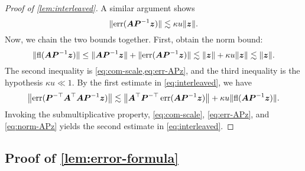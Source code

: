 \documentclass[onefignum,onetabnum,pagebackref,dvipsnames]{siamart220329}
\begin{document}
\begin{proof}[Proof of \cref{lem:interleaved}]
    A similar argument shows
    \begin{equation} \label{eq:err-APz}
        \|{\err(\mat{A}\mat{P}^{-1}\vec{z})}\| \lesssim \kappa u \norm{\vec{z}}.
    \end{equation}
    Now, we chain the two bounds together.
    First, obtain the norm bound:
    \begin{equation}\label{eq:norm-APz}
        \|{\fl(\mat{A}\mat{P}^{-1}\vec{z})}\| \le \|\mat{A}\mat{P}^{-1}\vec{z}\| + \|{\err(\mat{A}\mat{P}^{-1}\vec{z})}\| \lesssim \norm{\vec{z}} + \kappa u \norm{\vec{z}} \lesssim \norm{\vec{z}}.
    \end{equation}
    The second inequality is \cref{eq:com-scale,eq:err-APz}, and the third inequality is the hypothesis $\kappa u \ll 1$.
    By the first estimate in \cref{eq:interleaved}, we have
    \begin{equation*}
        \big\| {\operatorname{err}(\boldsymbol{P}^{-\top}\boldsymbol{A}^\top\boldsymbol{A}\boldsymbol{P}^{-1}\boldsymbol{z})} \big\| \lesssim \big\| \boldsymbol{A}^\top\boldsymbol{P}^{-\top} \operatorname{err}(\boldsymbol{A}\boldsymbol{P}^{-1}\boldsymbol{z})\big\| + \kappa u \|{\operatorname{fl}(\boldsymbol{A}\boldsymbol{P}^{-1}\boldsymbol{z})}\|.
    \end{equation*}
    Invoking the submultiplicative property, \cref{eq:com-scale}, \cref{eq:err-APz}, and \cref{eq:norm-APz} yields the second estimate in \cref{eq:interleaved}.
\end{proof}

\subsection{Proof of \cref{lem:error-formula}} \label{sec:proof-error-formula}
\end{document}
